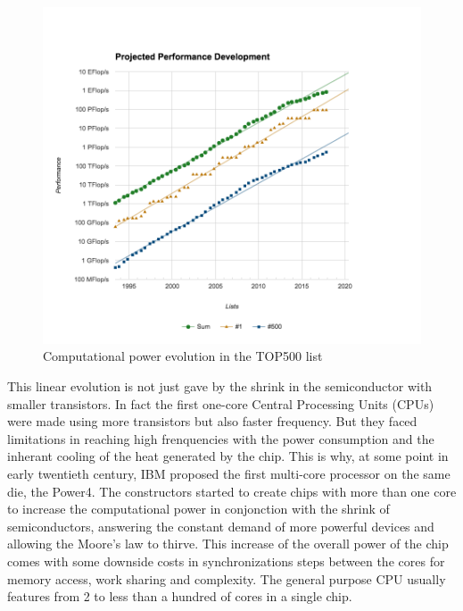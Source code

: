 \begin{figure}
\includegraphics[width=\linewidth]{figures/introduction/top500_list_approximation.png}
\caption{Computational power evolution in the TOP500 list}
\label{fig:intro_top500}
\end{figure}

This linear evolution is not just gave by the shrink in the semiconductor with smaller transistors.
In fact the first one-core Central Processing Units (CPUs) were made using more transistors but also faster frequency.
But they faced limitations in reaching high frenquencies with the power consumption and the inherant cooling of the heat generated by the chip.
This is why, at some point in early twentieth century, IBM proposed the first multi-core processor on the same die, the Power4.
The constructors started to create chips with more than one core to increase the computational power in conjonction with the shrink of semiconductors, answering the constant demand of more powerful devices and allowing the Moore's law to thirve. 
This increase of the overall power of the chip comes with some downside costs in synchronizations steps between the cores for memory access, work sharing and complexity.
The general purpose CPU usually features from 2 to less than a hundred of cores in a single chip.\\

